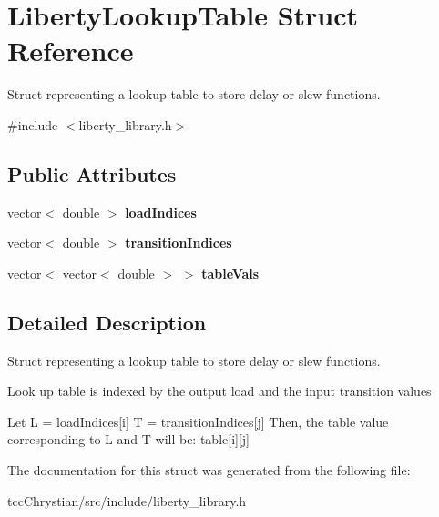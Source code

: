 \hypertarget{structLibertyLookupTable}{\section{Liberty\-Lookup\-Table Struct Reference}
\label{structLibertyLookupTable}
}


Struct representing a lookup table to store delay or slew functions.  




{\ttfamily \#include $<$liberty\-\_\-library.\-h$>$}

\subsection*{Public Attributes}
\begin{DoxyCompactItemize}
\item 
\hypertarget{structLibertyLookupTable_aa9185452db835be3f9c603c3f3df5562}{vector$<$ double $>$ {\bfseries load\-Indices}}\label{structLibertyLookupTable_aa9185452db835be3f9c603c3f3df5562}

\item 
\hypertarget{structLibertyLookupTable_a1f7a1d2e84535f8c7df9bac33732634d}{vector$<$ double $>$ {\bfseries transition\-Indices}}\label{structLibertyLookupTable_a1f7a1d2e84535f8c7df9bac33732634d}

\item 
\hypertarget{structLibertyLookupTable_a1ca823f563ac9e3e8a616b09a19da596}{vector$<$ vector$<$ double $>$ $>$ {\bfseries table\-Vals}}\label{structLibertyLookupTable_a1ca823f563ac9e3e8a616b09a19da596}

\end{DoxyCompactItemize}


\subsection{Detailed Description}
Struct representing a lookup table to store delay or slew functions. 

Look up table is indexed by the output load and the input transition values

Let L = load\-Indices\mbox{[}i\mbox{]} T = transition\-Indices\mbox{[}j\mbox{]} Then, the table value corresponding to L and T will be\-: table\mbox{[}i\mbox{]}\mbox{[}j\mbox{]} 

The documentation for this struct was generated from the following file\-:\begin{DoxyCompactItemize}
\item 
tcc\-Chrystian/src/include/liberty\-\_\-library.\-h\end{DoxyCompactItemize}
